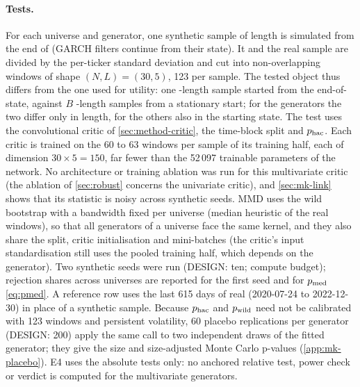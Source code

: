 \paragraph{Tests.}
For each universe and generator, one synthetic sample of \TEST{} length is simulated from the end
of \TRAIN{} (GARCH filters continue from their \TRAIN{} state). It and the real \TEST{} sample are
divided by the per-ticker \TRAIN{} standard deviation and cut into non-overlapping windows of
shape $(N,L)=(30,5)$, 123 per sample. The tested object thus differs from the one used for
utility: one \TEST{}-length sample started from the end-of-\TRAIN{} state, against $B$
\TRAIN{}-length samples from a stationary start; for the \iid{} generators the two differ only in
length, for the others also in the starting state. The \WC{} test uses the convolutional critic of
\cref{sec:method-critic}, the time-block split and $p_{\mathrm{hac}}$. Each critic is trained on the 60 to 63
windows per sample of its training half, each of dimension $30\times5=150$, far fewer than the
52\,097 trainable parameters of the network. No architecture or training ablation was run for
this multivariate critic (the ablation of \cref{sec:robust} concerns the univariate critic), and
\cref{sec:mk-link} shows that its statistic is noisy across synthetic seeds. MMD uses the wild
bootstrap with a bandwidth fixed per universe (median heuristic of the real \TEST{} windows), so
that all generators of a universe face the same kernel, and they also share the split, critic
initialisation and mini-batches (the critic's input standardisation still uses the pooled
training half, which depends on the generator). Two synthetic seeds were run (DESIGN: ten;
compute budget); rejection shares across universes are reported for the first seed and for $p_{\mathrm{med}}$
\eqref{eq:pmed}. A reference row uses the last 615 days of real \TRAIN{} (2020-07-24 to
2022-12-30) in place of a synthetic sample. Because $p_{\mathrm{hac}}$ and $p_{\mathrm{wild}}$ need not be calibrated
with 123 windows and persistent volatility, 60 placebo replications per generator (DESIGN: 200)
apply the same call to two independent draws of the fitted generator; they give the size and
size-adjusted Monte Carlo p-values (\cref{app:mk-placebo}). E4 uses the absolute tests only: no
anchored relative test, power check or verdict is computed for the multivariate generators.

